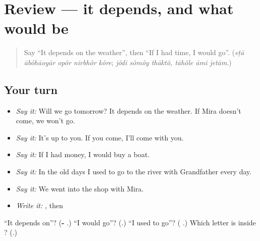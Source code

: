 \section[(review)]{Review — it depends, and what would be}

\label{lesson:BN-R275-depends-and-would}



\begin{quote}
Say \textquotedblleft{}It depends on the weather\textquotedblright{}, then \textquotedblleft{}If I had time, I would go\textquotedblright{}. (\emph{eṭā ābôhāoyār opôr nirbhôr kôre}; \emph{jôdi sômôy thāktô, tāhôle āmi jetām}.)
\end{quote}

\subsection*{Your turn}
\begin{itemize}
\raggedright
  \item \emph{Say it:} Will we go tomorrow? It depends on the weather. If Mira doesn't come, we won't go.
  \item \emph{Say it:} It's up to you. If you come, I'll come with you.
  \item \emph{Say it:} If I had money, I would buy a boat.
  \item \emph{Say it:} In the old days I used to go to the river with Grandfather every day.
  \item \emph{Say it:} We went into the shop with Mira.
  \item \emph{Write it:} \textbf{}, then \textbf{}
\end{itemize}

\begin{tcolorbox}[breakable,colback=teal!4,colframe=teal!35!black,title={Before you move on}]
\textquotedblleft{}It depends on\textquotedblright{}? (\textbf{-   }.) \textquotedblleft{}I would go\textquotedblright{}? (\textbf{}.) \textquotedblleft{}I used to go\textquotedblright{}? (\textbf{ }.) Which letter is inside \textbf{}? (\textbf{}.)
\end{tcolorbox}
